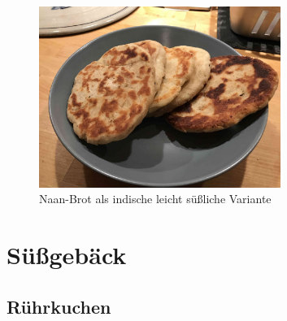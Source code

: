 \documentclass[a4paper, 12pt]{scrbook} 								%
\numberwithin{equation}{section} 									%
\begin{document}
		\begin{figure}[h]
			\centering
			\includegraphics[width = 0.7\textwidth]{media/naan_brot.JPG}
			\caption{Naan-Brot als indische leicht süßliche Variante}
		\end{figure}

		\newpage


	\section{Süßgebäck}
	\newpage


		\subsection{Rührkuchen}	\label{ruehrkuchen}
\end{document}
